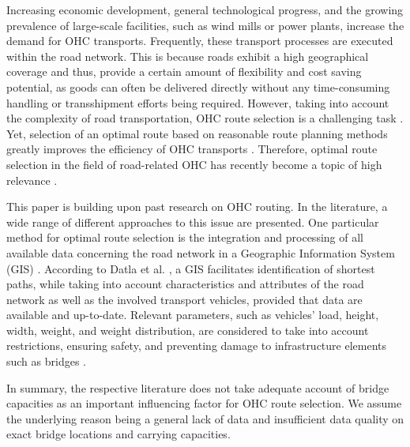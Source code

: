 %

Increasing economic development, general technological progress, and the growing prevalence of large-scale facilities, such as wind mills or power plants, increase the demand for OHC transports.
Frequently, these transport processes are executed within the road network. This is because roads exhibit a high geographical coverage and thus, provide a certain amount of flexibility and cost saving potential, as goods can often be delivered directly without any time-consuming handling or transshipment efforts being required. However, taking into account the complexity of road transportation, OHC route selection is a challenging task \cite{Bazaras.2013, xu2001methodology, sivilevicius2007dynamics}.
Yet, selection of an optimal route based on reasonable route planning methods greatly improves the efficiency of OHC transports \cite{meng2015optimized}.
Therefore, optimal route selection in the field of road-related OHC has recently become a topic of high relevance \cite{geisberger2011efficient}.
\par
This paper is building upon past research on OHC routing. In the literature, a wide range of different approaches to this issue are presented.
One particular method for optimal route selection is the integration and processing of all available data concerning the road network in a Geographic Information System (GIS) \cite{durham2002gis}.
According to Datla et al. \cite{datla2004gis}, a GIS facilitates identification of shortest paths, while taking into account characteristics and attributes of the road network as well as the involved transport vehicles, provided that data are available and up-to-date. Relevant parameters, such as vehicles' load, height, width, weight, and weight distribution, are considered to take into account restrictions, ensuring safety, and preventing damage to infrastructure elements such as bridges \cite{ecmt2006improving, vaitkus2016effect, kombe2017modelling, pauer2017development}.
\par
In summary, the respective literature does not take adequate account of bridge capacities as an important influencing factor for OHC route selection. We assume the underlying reason being a general lack of data and insufficient data quality on exact bridge locations and carrying capacities.



%
%
%
%
